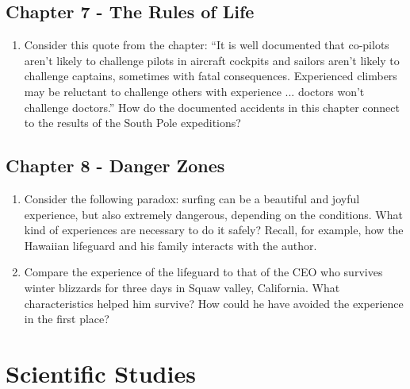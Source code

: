 \documentclass[10pt]{article}
\begin{document}
\subsection{Chapter 7 - The Rules of Life}

\begin{enumerate}
\item Consider this quote from the chapter: ``It is well documented that co-pilots aren't likely to challenge pilots in aircraft cockpits and sailors aren't likely to challenge captains, sometimes with fatal consequences.  Experienced climbers may be reluctant to challenge others with experience ... doctors won't challenge doctors.'' How do the documented accidents in this chapter connect to the results of the South Pole expeditions? \\ \vspace{1.5cm}
\end{enumerate}

\subsection{Chapter 8 - Danger Zones}

\begin{enumerate}
\item Consider the following paradox: surfing can be a beautiful and joyful experience, but also extremely dangerous, depending on the conditions.  What kind of experiences are necessary to do it safely?  Recall, for example, how the Hawaiian lifeguard and his family interacts with the author. \\ \vspace{1.5cm}
\item Compare the experience of the lifeguard to that of the CEO who survives winter blizzards for three days in Squaw valley, California.  What characteristics helped him survive?  How could he have avoided the experience in the first place? \\ \vspace{1.5cm}
\end{enumerate}

\section{Scientific Studies}
\end{document}
